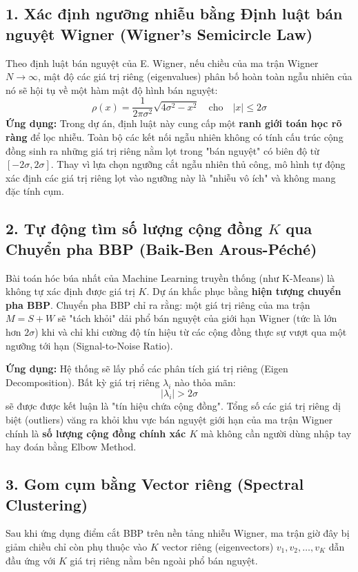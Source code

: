 \documentclass[12pt,a4paper]{article}
\begin{document}
\subsection{1. Xác định ngưỡng nhiễu bằng Định luật bán nguyệt Wigner (Wigner's Semicircle Law)}
Theo định luật bán nguyệt của E. Wigner, nếu chiều của ma trận Wigner $N \to \infty$, mật độ các giá trị riêng (eigenvalues) phân bố hoàn toàn ngẫu nhiên của nó sẽ hội tụ về một hàm mật độ hình bán nguyệt:
\begin{equation}
    \rho(x) = \frac{1}{2\pi \sigma^2} \sqrt{4\sigma^2 - x^2} \quad \text{cho} \quad |x| \leq 2\sigma
\end{equation}
\textbf{Ứng dụng:} 
Trong dự án, định luật này cung cấp một \textbf{ranh giới toán học rõ ràng} để lọc nhiễu. Toàn bộ các kết nối ngẫu nhiên không có tính cấu trúc cộng đồng sinh ra những giá trị riêng nằm lọt trong "bán nguyệt" có biên độ từ $[-2\sigma, 2\sigma]$. Thay vì lựa chọn ngưỡng cắt ngẫu nhiên thủ công, mô hình tự động xác định các giá trị riêng lọt vào ngưỡng này là "nhiễu vô ích" và không mang đặc tính cụm.

\subsection{2. Tự động tìm số lượng cộng đồng $K$ qua Chuyển pha BBP (Baik-Ben Arous-Péché)}
Bài toán hóc búa nhất của Machine Learning truyền thống (như K-Means) là không tự xác định được giá trị $K$. Dự án khắc phục bằng \textbf{hiện tượng chuyển pha BBP}. Chuyển pha BBP chỉ ra rằng: một giá trị riêng của ma trận $M = S + W$ sẽ "tách khỏi" dải phổ bán nguyệt của giới hạn Wigner (tức là lớn hơn $2\sigma$) khi và chỉ khi cường độ tín hiệu từ các cộng đồng thực sự vượt qua một ngưỡng tới hạn (Signal-to-Noise Ratio).

\textbf{Ứng dụng:}
Hệ thống sẽ lấy phổ các phân tích giá trị riêng (Eigen Decomposition). Bất kỳ giá trị riêng $\lambda_i$ nào thỏa mãn:
\begin{equation}
    |\lambda_i| > 2\sigma
\end{equation}
sẽ được được kết luận là "tín hiệu chứa cộng đồng". Tổng số các giá trị riêng dị biệt (outliers) văng ra khỏi khu vực bán nguyệt giới hạn của ma trận Wigner chính là \textbf{số lượng cộng đồng chính xác $K$} mà không cần người dùng nhập tay hay đoán bằng Elbow Method.

\subsection{3. Gom cụm bằng Vector riêng (Spectral Clustering)}
Sau khi ứng dụng điểm cắt BBP trên nền tảng nhiễu Wigner, ma trận giờ đây bị giảm chiều chỉ còn phụ thuộc vào $K$ vector riêng (eigenvectors) $v_1, v_2, \dots, v_K$ dẫn đầu ứng với $K$ giá trị riêng nằm bên ngoài phổ bán nguyệt.
\end{document}
